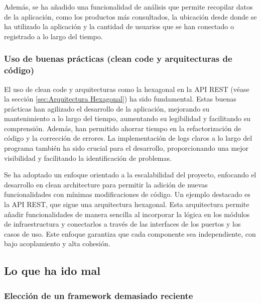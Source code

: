 \documentclass[12pt,twoside,titlepage]{report}
\begin{document}
Además, se ha añadido una funcionalidad de análisis que permite recopilar datos de la aplicación, como los productos más consultados, la ubicación desde donde se ha utilizado la aplicación y la cantidad de usuarios que se han conectado o registrado a lo largo del tiempo.


\subsubsection{Uso de buenas prácticas (clean code y arquitecturas de código)}

El uso de clean code y arquitecturas como la hexagonal en la API REST (véase la sección \ref{sec:Arquitectura Hexagonal}) ha sido fundamental. Estas buenas prácticas han agilizado el desarrollo de la aplicación, mejorando su mantenimiento a lo largo del tiempo, aumentando su legibilidad y facilitando su comprensión. Además, han permitido ahorrar tiempo en la refactorización de código y la corrección de errores. La implementación de logs claros a lo largo del programa también ha sido crucial para el desarrollo, proporcionando una mejor visibilidad y facilitando la identificación de problemas.

Se ha adoptado un enfoque orientado a la escalabilidad del proyecto, enfocando el desarrollo en clean architecture para permitir la adición de nuevas funcionalidades con mínimas modificaciones de código. Un ejemplo destacado es la API REST, que sigue una arquitectura hexagonal. Esta arquitectura permite añadir funcionalidades de manera sencilla al incorporar la lógica en los módulos de infraestructura y conectarlos a través de las interfaces de los puertos y los casos de uso. Este enfoque garantiza que cada componente sea independiente, con bajo acoplamiento y alta cohesión.

\subsection{Lo que ha ido mal}

	\subsubsection{Elección de un framework demasiado reciente}
 \label{sec:Mal-Kotlin-Multiplataforma}
\end{document}
